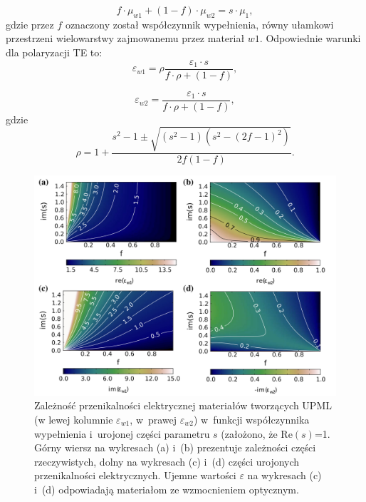 \begin{equation}
	f\cdot \mu_{w1} + (1-f)\cdot \mu_{w2} = s \cdot \mu_1,
	\label{eq:oqe6}
\end{equation}
gdzie przez $f$ oznaczony został współczynnik wypełnienia, równy ułamkowi przestrzeni wielowarstwy zajmowanemu przez materiał $w1$. Odpowiednie warunki dla polaryzacji TE to:
\begin{equation}
	\varepsilon_{w1}=\rho \frac{\varepsilon_1 \cdot s}{f\cdot \rho + (1 -f) },
	\label{eq:te-eps1}
\end{equation}

\begin{equation}
	\varepsilon_{w2}=\frac{\varepsilon_1 \cdot s}{f\cdot \rho + (1-f)},
	\label{eq:te-eps2}
\end{equation}
gdzie
\begin{equation}
	\rho = 1+\frac{s^2-1 \pm \sqrt{(s^2-1)(s^2-(2f-1)^2)}}{2f(1-f)}.
	\label{eq:te-rho}
\end{equation}

\begin{figure}[tb]
	\includegraphics[width=\textwidth]{images/pml/oqe_materials.png}
	\caption{Zależność przenikalności elektrycznej materiałów tworzących UPML (w lewej kolumnie $\varepsilon_{w1}$, w~prawej $\varepsilon_{w2}$) w~funkcji współczynnika wypełnienia i~urojonej części parametru $s$ (założono, że $\textrm{Re}(s)$=1. Górny wiersz na wykresach (a) i~(b) prezentuje zależności części rzeczywistych, dolny na wykresach (c) i~(d) części urojonych przenikalności elektrycznych. Ujemne wartości $\varepsilon$ na wykresach (c) i~(d) odpowiadają materiałom ze wzmocnieniem optycznym. }
	\label{fig:upml-eps-s-f}
\end{figure}

